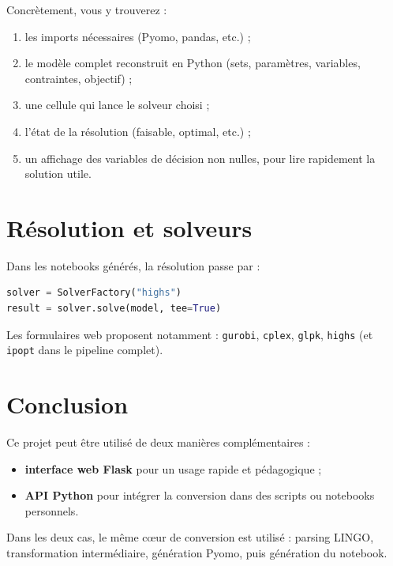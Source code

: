 \documentclass[11pt,a4paper]{article}
\begin{document}
\medskip
\noindent
Concrètement, vous y trouverez :
\begin{enumerate}[leftmargin=1.2cm]
  \item les imports nécessaires (Pyomo, pandas, etc.) ;
  \item le modèle complet reconstruit en Python (sets, paramètres, variables, contraintes, objectif) ;
  \item une cellule qui lance le solveur choisi ;
  \item l'état de la résolution (faisable, optimal, etc.) ;
  \item un affichage des variables de décision non nulles, pour lire rapidement la solution utile.
\end{enumerate}




\section{Résolution et solveurs}
Dans les notebooks générés, la résolution passe par :
\begin{lstlisting}[language=Python]
solver = SolverFactory("highs")
result = solver.solve(model, tee=True)
\end{lstlisting}

\noindent
Les formulaires web proposent notamment : \texttt{gurobi}, \texttt{cplex}, \texttt{glpk}, \texttt{highs} (et \texttt{ipopt} dans le pipeline complet).

\section{Conclusion}
Ce projet peut être utilisé de deux manières complémentaires :
\begin{itemize}[leftmargin=1.2cm]
  \item \textbf{interface web Flask} pour un usage rapide et pédagogique ;
  \item \textbf{API Python} pour intégrer la conversion dans des scripts ou notebooks personnels.
\end{itemize}

\noindent
Dans les deux cas, le même cœur de conversion est utilisé : parsing LINGO, transformation intermédiaire, génération Pyomo, puis génération du notebook.
\end{document}
